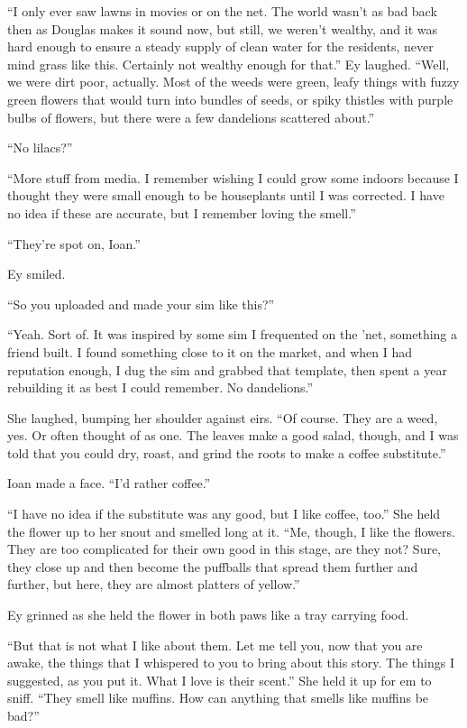 ``I only ever saw lawns in movies or on the net. The world wasn't as bad back then as Douglas makes it sound now, but still, we weren't wealthy, and it was hard enough to ensure a steady supply of clean water for the residents, never mind grass like this. Certainly not wealthy enough for that.'' Ey laughed. ``Well, we were dirt poor, actually. Most of the weeds were green, leafy things with fuzzy green flowers that would turn into bundles of seeds, or spiky thistles with purple bulbs of flowers, but there were a few dandelions scattered about.''

``No lilacs?''

``More stuff from media. I remember wishing I could grow some indoors because I thought they were small enough to be houseplants until I was corrected. I have no idea if these are accurate, but I remember loving the smell.''

``They're spot on, Ioan.''

Ey smiled.

``So you uploaded and made your sim like this?''

``Yeah. Sort of. It was inspired by some sim I frequented on the 'net, something a friend built. I found something close to it on the market, and when I had reputation enough, I dug the sim and grabbed that template, then spent a year rebuilding it as best I could remember. No dandelions.''

She laughed, bumping her shoulder against eirs. ``Of course. They are a weed, yes. Or often thought of as one. The leaves make a good salad, though, and I was told that you could dry, roast, and grind the roots to make a coffee substitute.''

Ioan made a face. ``I'd rather coffee.''

``I have no idea if the substitute was any good, but I like coffee, too.'' She held the flower up to her snout and smelled long at it. ``Me, though, I like the flowers. They are too complicated for their own good in this stage, are they not? Sure, they close up and then become the puffballs that spread them further and further, but here, they are almost platters of yellow.''

Ey grinned as she held the flower in both paws like a tray carrying food.

``But that is not what I like about them. Let me tell you, now that you are awake, the things that I whispered to you to bring about this story. The things I suggested, as you put it. What I love is their scent.'' She held it up for em to sniff. ``They smell like muffins. How can anything that smells like muffins be bad?''

